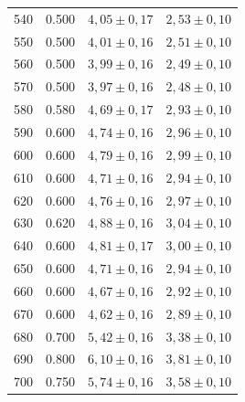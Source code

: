 \begin{table}[H]
\begin{tabular}{S[table-format=3.0] S[table-format=1.3] S  S}
      540  &  0.500 &  {$4,05 \pm 0,17$} &  {$2,53 \pm 0,10$}       \\
      550  &  0.500 &  {$4,01 \pm 0,16$} &  {$2,51 \pm 0,10$}       \\
      560  &  0.500 &  {$3,99 \pm 0,16$} &  {$2,49 \pm 0,10$}       \\
      570  &  0.500 &  {$3,97 \pm 0,16$} &  {$2,48 \pm 0,10$}       \\
      580  &  0.580 &  {$4,69 \pm 0,17$} &  {$2,93 \pm 0,10$}       \\
      590  &  0.600 &  {$4,74 \pm 0,16$} &  {$2,96 \pm 0,10$}       \\
      600  &  0.600 &  {$4,79 \pm 0,16$} &  {$2,99 \pm 0,10$}       \\
      610  &  0.600 &  {$4,71 \pm 0,16$} &  {$2,94 \pm 0,10$}       \\
      620  &  0.600 &  {$4,76 \pm 0,16$} &  {$2,97 \pm 0,10$}       \\
      630  &  0.620 &  {$4,88 \pm 0,16$} &  {$3,04 \pm 0,10$}       \\
      640  &  0.600 &  {$4,81 \pm 0,17$} &  {$3,00 \pm 0,10$}       \\
      650  &  0.600 &  {$4,71 \pm 0,16$} &  {$2,94 \pm 0,10$}       \\
      660  &  0.600 &  {$4,67 \pm 0,16$} &  {$2,92 \pm 0,10$}       \\
      670  &  0.600 &  {$4,62 \pm 0,16$} &  {$2,89 \pm 0,10$}       \\
      680  &  0.700 &  {$5,42 \pm 0,16$} &  {$3,38 \pm 0,10$}       \\
      690  &  0.800 &  {$6,10 \pm 0,16$} &  {$3,81 \pm 0,10$}       \\
      700  &  0.750 &  {$5,74 \pm 0,16$} &  {$3,58 \pm 0,10$}       \\ 
    \bottomrule
    \end{tabular}
\end{table}
